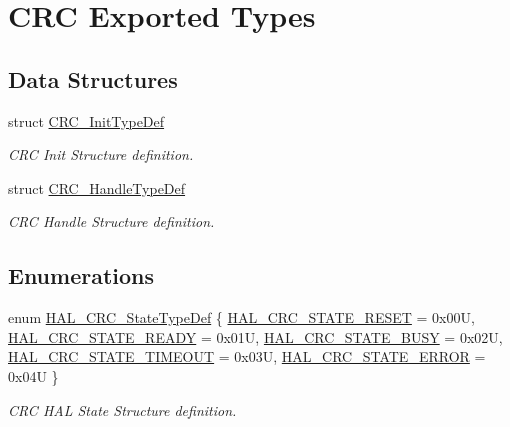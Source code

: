 \hypertarget{group___c_r_c___exported___types}{}\section{C\+RC Exported Types}
\label{group___c_r_c___exported___types}
\subsection*{Data Structures}
\begin{DoxyCompactItemize}
\item 
struct \hyperlink{struct_c_r_c___init_type_def}{C\+R\+C\+\_\+\+Init\+Type\+Def}
\begin{DoxyCompactList}\small\item\em C\+RC Init Structure definition. \end{DoxyCompactList}\item 
struct \hyperlink{struct_c_r_c___handle_type_def}{C\+R\+C\+\_\+\+Handle\+Type\+Def}
\begin{DoxyCompactList}\small\item\em C\+RC Handle Structure definition. \end{DoxyCompactList}\end{DoxyCompactItemize}
\subsection*{Enumerations}
\begin{DoxyCompactItemize}
\item 
enum \hyperlink{group___c_r_c___exported___types_ga1021d6f27a072d45f6f3b233eefd8bbe}{H\+A\+L\+\_\+\+C\+R\+C\+\_\+\+State\+Type\+Def} \{ \newline
\hyperlink{group___c_r_c___exported___types_gga1021d6f27a072d45f6f3b233eefd8bbea313bbe8353f8a8b48fbd129261266a97}{H\+A\+L\+\_\+\+C\+R\+C\+\_\+\+S\+T\+A\+T\+E\+\_\+\+R\+E\+S\+ET} = 0x00U, 
\hyperlink{group___c_r_c___exported___types_gga1021d6f27a072d45f6f3b233eefd8bbeaa47f50129543b87fac3a83df1a634474}{H\+A\+L\+\_\+\+C\+R\+C\+\_\+\+S\+T\+A\+T\+E\+\_\+\+R\+E\+A\+DY} = 0x01U, 
\hyperlink{group___c_r_c___exported___types_gga1021d6f27a072d45f6f3b233eefd8bbea9d03b0c1d233e87e35b9c5c8353a4b70}{H\+A\+L\+\_\+\+C\+R\+C\+\_\+\+S\+T\+A\+T\+E\+\_\+\+B\+U\+SY} = 0x02U, 
\hyperlink{group___c_r_c___exported___types_gga1021d6f27a072d45f6f3b233eefd8bbea5d803dcd1d578edb76b57e3d34adc5a8}{H\+A\+L\+\_\+\+C\+R\+C\+\_\+\+S\+T\+A\+T\+E\+\_\+\+T\+I\+M\+E\+O\+UT} = 0x03U, 
\newline
\hyperlink{group___c_r_c___exported___types_gga1021d6f27a072d45f6f3b233eefd8bbeadb51c35f7716430bb0c893069466a1b2}{H\+A\+L\+\_\+\+C\+R\+C\+\_\+\+S\+T\+A\+T\+E\+\_\+\+E\+R\+R\+OR} = 0x04U
 \}\begin{DoxyCompactList}\small\item\em C\+RC H\+AL State Structure definition. \end{DoxyCompactList}
\end{DoxyCompactItemize}


